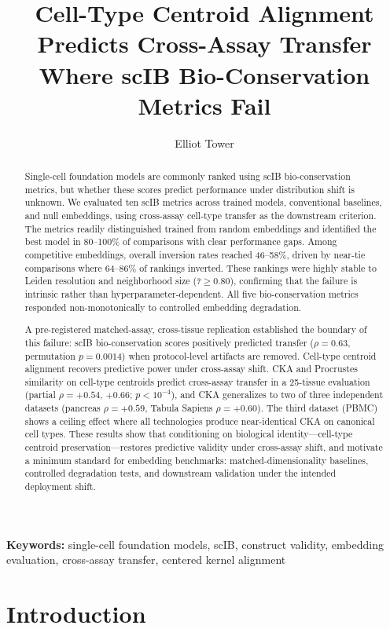 \documentclass[11pt]{article}
\title{Cell-Type Centroid Alignment Predicts Cross-Assay Transfer\\Where scIB Bio-Conservation Metrics Fail}
\author{Elliot Tower}
\affil{Independent Researcher \\ \texttt{elliot@elliottower.ai}}
\date{}
\begin{document}
\linenumbers
\maketitle

\begin{abstract}
Single-cell foundation models are commonly ranked using scIB
bio-conservation metrics, but whether these scores predict performance
under distribution shift is unknown. We evaluated ten scIB metrics
across trained models, conventional baselines, and null embeddings,
using cross-assay cell-type transfer as the downstream criterion.
The metrics readily distinguished trained from random embeddings and
identified the best model in 80--100\% of comparisons with clear
performance gaps. Among competitive embeddings, overall inversion rates
reached 46--58\%, driven by near-tie comparisons where
64--86\% of rankings inverted. These rankings were highly stable to Leiden resolution and
neighborhood size ($\bar{\tau} \geq 0.80$), confirming that the failure
is intrinsic rather than hyperparameter-dependent. All five
bio-conservation metrics responded non-monotonically to controlled
embedding degradation.

A pre-registered matched-assay, cross-tissue replication established
the boundary of this failure: scIB bio-conservation scores positively
predicted transfer ($\rho = 0.63$, permutation $p = 0.0014$) when
protocol-level artifacts are removed. Cell-type centroid alignment
recovers predictive power under cross-assay shift. CKA and Procrustes
similarity on cell-type centroids predict cross-assay transfer in a
25-tissue evaluation (partial $\rho = +0.54$, $+0.66$;
$p < 10^{-4}$), and CKA generalizes to two of three independent
datasets (pancreas $\rho = +0.59$, Tabula Sapiens $\rho = +0.60$).
The third dataset (PBMC) shows a ceiling effect where all technologies
produce near-identical CKA on canonical cell types. These results
show that conditioning on biological identity---cell-type centroid
preservation---restores predictive validity under cross-assay shift,
and motivate a minimum standard
for embedding benchmarks: matched-dimensionality baselines, controlled
degradation tests, and downstream validation under the intended
deployment shift.
\end{abstract}

\noindent\textbf{Keywords:} single-cell foundation models, scIB, construct validity, embedding evaluation, cross-assay transfer, centered kernel alignment


\section{Introduction}
\label{sec:intro}
\end{document}
